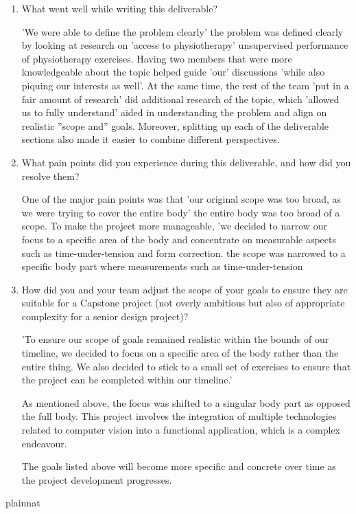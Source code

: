 \documentclass{article}
\begin{document}
\begin{enumerate}
    \item What went well while writing this deliverable? 

    'We were able to define the problem clearly' the problem was defined clearly by looking at research on 'access to physiotherapy' unsupervised performance of physiotherapy exercises. Having 
    two members that were more knowledgeable 
    about the topic helped guide 'our' discussions 'while also piquing our interests as well'. At the same time, the 
    rest of the team 'put in a fair amount of research' did additional research of the topic, which 'allowed us to fully understand' aided in understanding the problem and align 
    on realistic ''scope and'' goals. Moreover, splitting up each of the deliverable sections also made it easier to combine 
    different perspectives.

    \item What pain points did you experience during this deliverable, and how
    did you resolve them?

    One of the major pain points was that 'our original scope was too broad, as we were trying to cover the entire body' the entire body was too broad of a scope. To 
    make the project more manageable, 'we decided to narrow our focus to a specific area of the body and concentrate on
    measurable aspects such as time-under-tension and form correction.  the scope was narrowed to a specific body part where measurements such as time-under-tension

    \item How did you and your team adjust the scope of your goals to ensure
    they are suitable for a Capstone project (not overly ambitious but also of
    appropriate complexity for a senior design project)?

    'To ensure our scope of goals remained realistic within the bounds of our timeline, we decided to focus on a specific area 
    of the body rather than the entire thing. We also decided to stick to a small set of exercises to ensure that the project
    can be completed within our timeline.'
    
    As mentioned above, the focus was shifted to a singular body part as opposed the full body. This project involves the integration 
    of multiple technologies related to computer vision into a functional application, which is a complex endeavour. 
    
    The goals listed above will become more specific and concrete over time as the project development progresses. 
\end{enumerate}  

 {plainnat}

\end{document}
